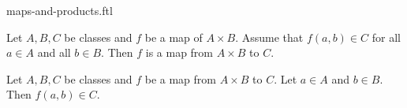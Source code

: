 \documentclass{naproche-library}
\begin{document}
\begin{smodule}[title=Maps and Products]{maps-and-products.ftl}

\begin{proposition}[forthel,id=FOUNDATIONS_06_2754759509409792]
  Let $A, B, C$ be classes and $f$ be a map of $A \times B$.
  Assume that $f(a,b) \in C$ for all $a \in A$ and all $b \in B$.
  Then $f$ is a map from $A \times B$ to $C$.
\end{proposition}

\begin{proposition}[forthel,id=FOUNDATIONS_06_2304295212941312]
  Let $A, B, C$ be classes and $f$ be a map from $A \times B$ to $C$.
  Let $a \in A$ and $b \in B$.
  Then $f(a,b) \in C$.
\end{proposition}
\end{smodule}
\end{document}
